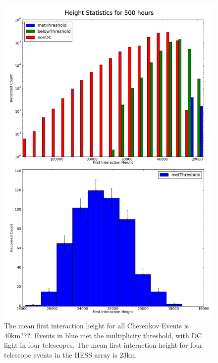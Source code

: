 \documentclass{article}
\begin{document}
\begin{figure}
\begin{center}
\includegraphics[height=0.9\textheight]{hessheight}
\caption{The mean first interaction height for all Cherenkov Events is 40km???. Events in blue met the multiplicity threshold, with DC light in four telescopes. The mean first interaction height for four telescope events in the HESS array is 23km}
\label{fig:Hessheight}
\end{center}
\end{figure}
\end{document}
